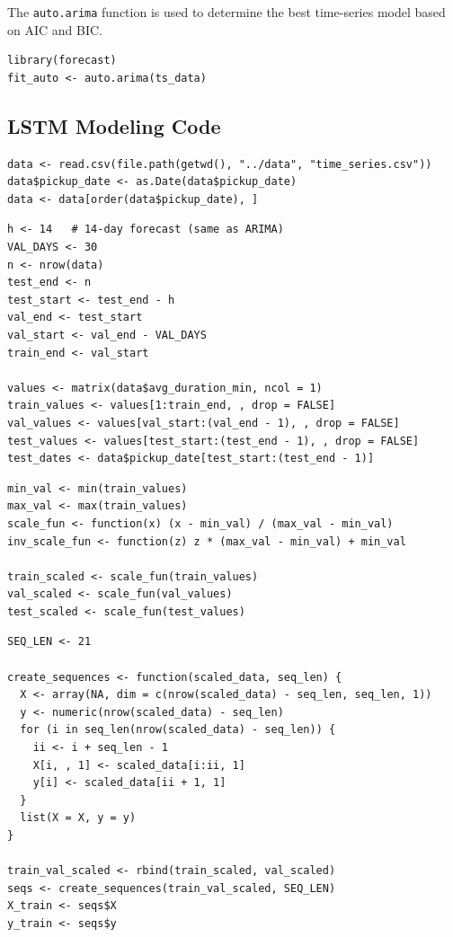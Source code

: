 \documentclass[12pt, a4paper]{article}
\begin{document}
The \texttt{auto.arima} function is used to determine the best time-series model based on AIC and BIC.

\begin{lstlisting}[style=pystyle, caption={ARIMA Model}, label=lst:arima_model]
library(forecast)
fit_auto <- auto.arima(ts_data)
\end{lstlisting}

\subsection{LSTM Modeling Code}\label{appendix:lstm_modeling_code}

\begin{lstlisting}[style=pystyle, caption={Loading Time Series}, label=lst:lstm_load_time_series]
data <- read.csv(file.path(getwd(), "../data", "time_series.csv"))
data$pickup_date <- as.Date(data$pickup_date)
data <- data[order(data$pickup_date), ]
\end{lstlisting}

\begin{lstlisting}[style=pystyle, caption={Create Training/Validation/Test Sets}, label=lst:lstm_split]
h <- 14   # 14-day forecast (same as ARIMA)
VAL_DAYS <- 30
n <- nrow(data)
test_end <- n
test_start <- test_end - h
val_end <- test_start
val_start <- val_end - VAL_DAYS
train_end <- val_start

values <- matrix(data$avg_duration_min, ncol = 1)
train_values <- values[1:train_end, , drop = FALSE]
val_values <- values[val_start:(val_end - 1), , drop = FALSE]
test_values <- values[test_start:(test_end - 1), , drop = FALSE]
test_dates <- data$pickup_date[test_start:(test_end - 1)]
\end{lstlisting}

\begin{lstlisting}[style=pystyle, caption={Scaling}, label=lst:lstm_scaling]
min_val <- min(train_values)
max_val <- max(train_values)
scale_fun <- function(x) (x - min_val) / (max_val - min_val)
inv_scale_fun <- function(z) z * (max_val - min_val) + min_val

train_scaled <- scale_fun(train_values)
val_scaled <- scale_fun(val_values)
test_scaled <- scale_fun(test_values)
\end{lstlisting}

\begin{lstlisting}[style=pystyle, caption={Build Sliding Window Sequence}, label=lst:lstm_seq]
SEQ_LEN <- 21

create_sequences <- function(scaled_data, seq_len) {
  X <- array(NA, dim = c(nrow(scaled_data) - seq_len, seq_len, 1))
  y <- numeric(nrow(scaled_data) - seq_len)
  for (i in seq_len(nrow(scaled_data) - seq_len)) {
    ii <- i + seq_len - 1
    X[i, , 1] <- scaled_data[i:ii, 1]
    y[i] <- scaled_data[ii + 1, 1]
  }
  list(X = X, y = y)
}

train_val_scaled <- rbind(train_scaled, val_scaled)
seqs <- create_sequences(train_val_scaled, SEQ_LEN)
X_train <- seqs$X
y_train <- seqs$y
\end{lstlisting}
\end{document}
